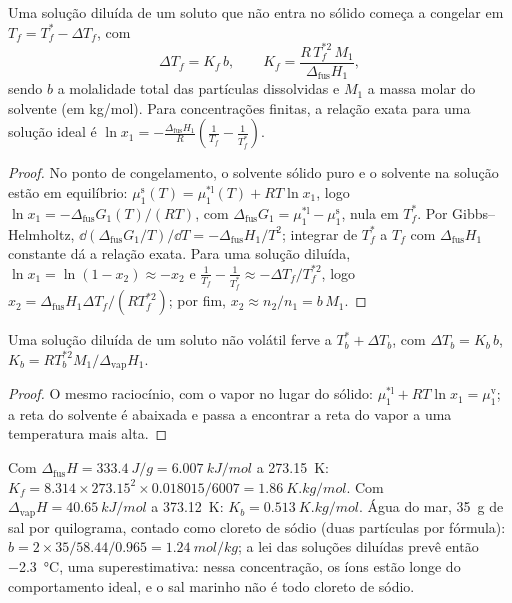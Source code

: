 \begin{theorem}\label{thm:b2:chemical-potential:cryoscopy}
Uma solução diluída de um soluto que não entra no sólido começa a congelar
em $T_f = T_f^* - \Delta T_f$, com
\[
  \Delta T_f = K_f\,b, \qquad K_f = \frac{R\,T_f^{*2}\,M_1}{\Delta_{\text{fus}}H_1} ,
\]
sendo $b$ a molalidade total das partículas dissolvidas e $M_1$ a massa
molar do solvente (em \unit{kg/mol}). Para concentrações finitas, a relação
exata para uma solução ideal é $\ln x_1 = -\frac{\Delta_{\text{fus}}H_1}{R}
\left(\frac{1}{T_f} - \frac{1}{T_f^*}\right)$.
\end{theorem}

\begin{proof}
No ponto de congelamento, o solvente sólido puro e o solvente na solução
estão em equilíbrio: $\mu_1^{\text{s}}(T) = \mu_1^{*\text{l}}(T) + RT\ln x_1$,
logo $\ln x_1 = -\Delta_{\text{fus}}G_1(T)/(RT)$, com $\Delta_{\text{fus}}G_1 =
\mu_1^{*\text{l}} - \mu_1^{\text{s}}$, nula em $T_f^*$. Por Gibbs--Helmholtz,
$\dd(\Delta_{\text{fus}}G_1/T)/\dd T = -\Delta_{\text{fus}}H_1/T^2$;
integrar de $T_f^*$ a $T_f$ com $\Delta_{\text{fus}}H_1$ constante dá a
relação exata. Para uma solução diluída, $\ln x_1 = \ln(1 - x_2) \approx
-x_2$ e $\frac1{T_f} - \frac1{T_f^*} \approx -\Delta T_f/T_f^{*2}$, logo
$x_2 = \Delta_{\text{fus}}H_1\Delta T_f/(RT_f^{*2})$; por fim, $x_2 \approx
n_2/n_1 = b\,M_1$.
\end{proof}

\begin{proposition}\label{prop:b2:chemical-potential:ebullioscopy}
Uma solução diluída de um soluto não volátil ferve a $T_b^* + \Delta T_b$, com
$\Delta T_b = K_b\,b$, $K_b = RT_b^{*2}M_1/\Delta_{\text{vap}}H_1$.
\end{proposition}

\begin{proof}
O mesmo raciocínio, com o vapor no lugar do sólido: $\mu_1^{*\text{l}} +
RT\ln x_1 = \mu_1^{\text{v}}$; a reta do solvente é abaixada e passa a
encontrar a reta do vapor a uma temperatura mais alta.
\end{proof}

\begin{example}[A água]\label{ex:b2:chemical-potential:water-constants}
Com $\Delta_{\text{fus}}H = \qty{333.4}{J/g} = \qty{6.007}{kJ/mol}$ a
\qty{273.15}{K}: $K_f = 8.314 \times 273.15^2 \times 0.018015/6007 =
\qty{1.86}{K.kg/mol}$. Com $\Delta_{\text{vap}}H = \qty{40.65}{kJ/mol}$ a
\qty{373.12}{K}: $K_b = \qty{0.513}{K.kg/mol}$. Água do mar, \qty{35}{g} de sal
por quilograma, contado como cloreto de sódio (duas partículas por fórmula):
$b = 2 \times 35/58.44/0.965 = \qty{1.24}{mol/kg}$; a lei das soluções
diluídas prevê então \qty{-2.3}{\celsius}, uma superestimativa: nessa
concentração, os íons estão longe do comportamento ideal, e o sal marinho
não é todo cloreto de sódio.
\end{example}

